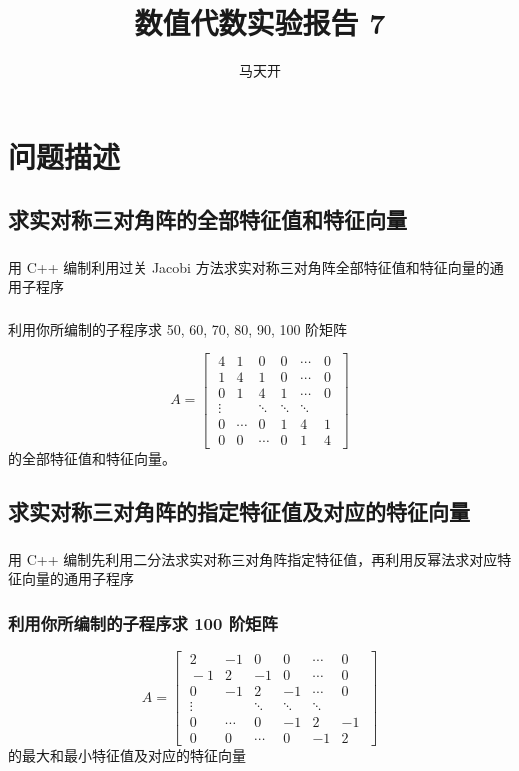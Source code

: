 \documentclass{article}
\title{数值代数实验报告 7}
\author{马天开}
\begin{document}
\maketitle

\section{问题描述}

\subsection{求实对称三对角阵的全部特征值和特征向量}

\subsubsection{}用 C++ 编制利用过关 Jacobi 方法求实对称三对角阵全部特征值和特征向量的通用子程序

\subsubsection{}利用你所编制的子程序求 50, 60, 70, 80, 90, 100 阶矩阵

\[
A=\begin{bmatrix}
\;4 & 1 & 0 & 0 & \cdots & 0 \;\\
\;1 & 4 & 1 & 0 & \cdots & 0 \;\\
\;0 & 1 & 4 & 1 & \cdots & 0 \;\\
\;\vdots & & \ddots & \ddots & \ddots \;\\
\;0 & \cdots & 0 & 1 & 4 & 1\;\\
\;0 & 0 & \cdots & 0 & 1 & 4\;
\end{bmatrix}
\]
的全部特征值和特征向量。

\subsection{求实对称三对角阵的指定特征值及对应的特征向量}

\subsubsection{}用 C++ 编制先利用二分法求实对称三对角阵指定特征值，再利用反幂法求对应特征向量的通用子程序

\subsubsection{利用你所编制的子程序求 100 阶矩阵}
\[
A=\begin{bmatrix}
\;2 & -1 & 0 & 0 & \cdots & 0 \;\\
\;-1 & 2 & -1 & 0 & \cdots & 0 \;\\
\;0 & -1 & 2 & -1 & \cdots & 0 \;\\
\;\vdots & & \ddots & \ddots & \ddots \;\\
\;0 & \cdots & 0 & -1 & 2 & -1\;\\
\;0 & 0 & \cdots & 0 & -1 & 2\;
\end{bmatrix}
\]
的最大和最小特征值及对应的特征向量
\end{document}
